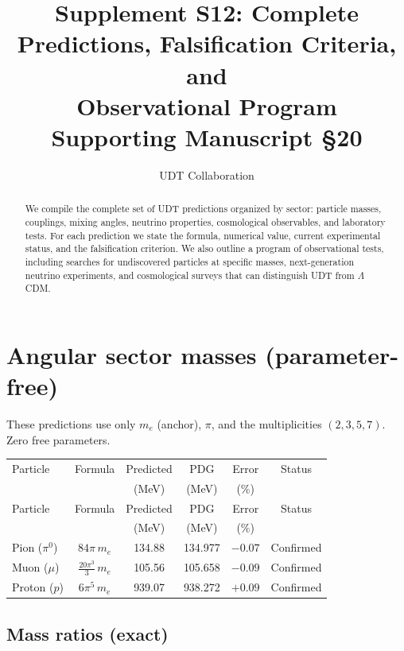 \documentclass[11pt,letterpaper]{article}
\title{Supplement S12: Complete Predictions, Falsification Criteria, and\\
Observational Program \\
\large Supporting Manuscript \S20}
\author{UDT Collaboration}
\date{}
\numberwithin{equation}{section}
\begin{document}
\maketitle

\begin{abstract}
We compile the complete set of UDT predictions organized by sector:
particle masses, couplings, mixing angles, neutrino properties,
cosmological observables, and laboratory tests. For each prediction we
state the formula, numerical value, current experimental status, and
the falsification criterion. We also outline a program of observational
tests, including searches for undiscovered particles at specific masses,
next-generation neutrino experiments, and cosmological surveys that can
distinguish UDT from $\Lambda$CDM.
\end{abstract}

\tableofcontents

\section{Angular sector masses (parameter-free)}
\label{sec:angular_masses}

These predictions use only $m_e$ (anchor), $\pi$, and the multiplicities
$(2,3,5,7)$. Zero free parameters.

\begin{longtable}{lccccc}
\toprule
Particle & Formula & Predicted & PDG & Error & Status \\
 & & (MeV) & (MeV) & (\%) & \\
\midrule
\endfirsthead
\toprule
Particle & Formula & Predicted & PDG & Error & Status \\
 & & (MeV) & (MeV) & (\%) & \\
\midrule
\endhead
Pion ($\pi^0$) & $84\pi\,m_e$ & 134.88 & 134.977 & $-0.07$ & Confirmed \\
Muon ($\mu$)   & $\frac{20\pi^3}{3}\,m_e$ & 105.56 & 105.658 & $-0.09$ & Confirmed \\
Proton ($p$)   & $6\pi^5\,m_e$ & 939.07 & 938.272 & $+0.09$ & Confirmed \\
\bottomrule
\end{longtable}

\subsection{Mass ratios (exact)}
\end{document}
